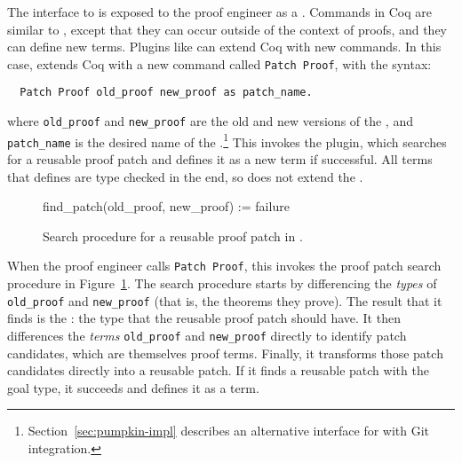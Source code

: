 The interface to \sysname is exposed to the proof engineer as a .
Commands in Coq are similar to , except that they can occur outside of the context of proofs, and they can define new terms.
Plugins like \sysname can extend Coq with new commands.
In this case, \sysname extends Coq with a new command called \lstinline{Patch Proof}, with the syntax:

\begin{lstlisting}
  Patch Proof old_proof new_proof as patch_name. 
\end{lstlisting}
where \lstinline{old_proof} and \lstinline{new_proof} are the old and new versions of the ,
and \lstinline{patch_name} is the desired name of the .\footnote{Section~\ref{sec:pumpkin-impl} describes an alternative interface for \sysname with Git integration.} This invokes the \sysname plugin, which searches for a reusable proof patch
and defines it as a new term if successful.
All terms that \sysname defines are type checked in the end, so \sysname does not extend the .

\begin{figure}
\begin{algorithmic}
\renewcommand{\thealgorithm}{}
\footnotesize
\STATE \hspace{-0.5cm} \footnotesize{find\_patch(old\_proof, new\_proof) :=}
    \STATE {}
    \STATE {}
      \STATE {}
    \ENDIF
    \RETURN failure
\end{algorithmic}
\caption{Search procedure for a reusable proof patch in \sysname.}
\label{alg:patching}	
\end{figure}

When the proof engineer calls \lstinline{Patch Proof}, this invokes the proof patch search procedure in Figure~\ref{alg:patching}.
The search procedure starts by differencing the \textit{types} of \lstinline{old_proof} and \lstinline{new_proof}
(that is, the theorems they prove).
The result that it finds is the : the type that the reusable proof patch should have.
It then differences the \textit{terms} \lstinline{old_proof} and \lstinline{new_proof} directly to identify patch candidates,
which are themselves proof terms.
Finally, it transforms those patch candidates directly into a reusable patch.
If it finds a reusable patch with the goal type, it succeeds and defines it as a term.

